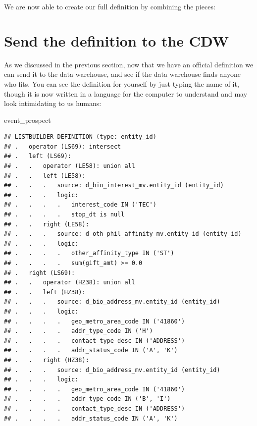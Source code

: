 \documentclass[]{book}
\newenvironment{Shaded}{\begin{snugshade}}{\end{snugshade}}
\newcommand{\NormalTok}[1]{#1}
\newcommand{\OperatorTok}[1]{\textcolor[rgb]{0.81,0.36,0.00}{\textbf{#1}}}
\newcommand{\StringTok}[1]{\textcolor[rgb]{0.31,0.60,0.02}{#1}}
\begin{document}
We are now able to create our full definition by combining the pieces:

\begin{Shaded}
\end{Shaded}

\hypertarget{send-the-definition-to-the-cdw}{%
\section{Send the definition to the CDW}\label{send-the-definition-to-the-cdw}}

As we discussed in the previous section, now that we have an official definition we can send it to the data warehouse, and see if the data warehouse finds anyone who fits. You can see the definition for yourself by just typing the name of it, though it is now written in a language for the computer to understand and may look intimidating to us humans:

\begin{Shaded}
\begin{Highlighting}[]
\NormalTok{event_prospect}
\end{Highlighting}
\end{Shaded}

\begin{verbatim}
## LISTBUILDER DEFINITION (type: entity_id)
## .   operator (LS69): intersect
## .   left (LS69): 
## .   .   operator (LE58): union all
## .   .   left (LE58): 
## .   .   .   source: d_bio_interest_mv.entity_id (entity_id)
## .   .   .   logic: 
## .   .   .   .   interest_code IN ('TEC')
## .   .   .   .   stop_dt is null
## .   .   right (LE58): 
## .   .   .   source: d_oth_phil_affinity_mv.entity_id (entity_id)
## .   .   .   logic: 
## .   .   .   .   other_affinity_type IN ('ST')
## .   .   .   .   sum(gift_amt) >= 0.0
## .   right (LS69): 
## .   .   operator (HZ38): union all
## .   .   left (HZ38): 
## .   .   .   source: d_bio_address_mv.entity_id (entity_id)
## .   .   .   logic: 
## .   .   .   .   geo_metro_area_code IN ('41860')
## .   .   .   .   addr_type_code IN ('H')
## .   .   .   .   contact_type_desc IN ('ADDRESS')
## .   .   .   .   addr_status_code IN ('A', 'K')
## .   .   right (HZ38): 
## .   .   .   source: d_bio_address_mv.entity_id (entity_id)
## .   .   .   logic: 
## .   .   .   .   geo_metro_area_code IN ('41860')
## .   .   .   .   addr_type_code IN ('B', 'I')
## .   .   .   .   contact_type_desc IN ('ADDRESS')
## .   .   .   .   addr_status_code IN ('A', 'K')
\end{verbatim}
\end{document}
